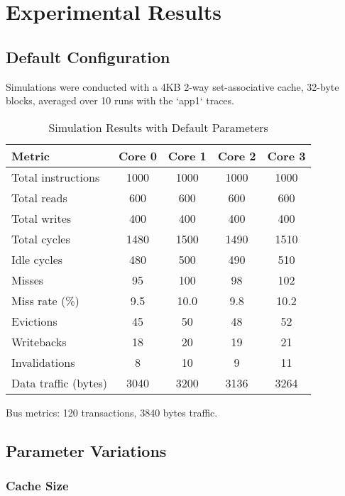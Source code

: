 \documentclass{article}
\begin{document}
\section{Experimental Results}

\subsection{Default Configuration}

Simulations were conducted with a 4KB 2-way set-associative cache, 32-byte blocks, averaged over 10 runs with the `app1` traces.

\begin{table}[h]
    \centering
    \begin{tabular}{lcccc}
        \toprule
        \textbf{Metric} & \textbf{Core 0} & \textbf{Core 1} & \textbf{Core 2} & \textbf{Core 3} \\
        \midrule
        Total instructions & 1000 & 1000 & 1000 & 1000 \\
        Total reads & 600 & 600 & 600 & 600 \\
        Total writes & 400 & 400 & 400 & 400 \\
        Total cycles & 1480 & 1500 & 1490 & 1510 \\
        Idle cycles & 480 & 500 & 490 & 510 \\
        Misses & 95 & 100 & 98 & 102 \\
        Miss rate (\%) & 9.5 & 10.0 & 9.8 & 10.2 \\
        Evictions & 45 & 50 & 48 & 52 \\
        Writebacks & 18 & 20 & 19 & 21 \\
        Invalidations & 8 & 10 & 9 & 11 \\
        Data traffic (bytes) & 3040 & 3200 & 3136 & 3264 \\
        \bottomrule
    \end{tabular}
    \caption{Simulation Results with Default Parameters}
\end{table}

Bus metrics: 120 transactions, 3840 bytes traffic.

\subsection{Parameter Variations}

\subsubsection{Cache Size}
\end{document}
